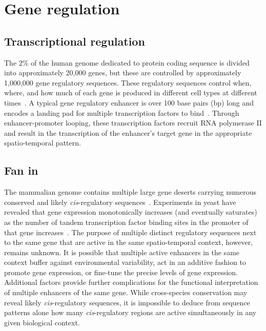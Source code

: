 \section{Gene regulation}

\subsection{Transcriptional regulation}

The 2\% of the human genome dedicated to protein coding sequence is divided into approximately 20,000 genes, but these are controlled by approximately 1,000,000 gene regulatory sequences. These regulatory sequences control when, where, and how much of each gene is produced in different cell types at different times~\citep{Levo:2014hl}. A typical gene regulatory enhancer is over 100 base pairs (bp) long and encodes a landing pad for multiple transcription factors to bind~\citep{Spitz:2012fj}. Through enhancer-promoter looping, these transcription factors recruit RNA polymerase II and result in the transcription of the enhancer's target gene in the appropriate spatio-temporal pattern.

\subsection{Fan in}

The mammalian genome contains multiple large gene deserts carrying numerous conserved and likely \emph{cis}-regulatory sequences~\citep{Ovcharenko:2005br}. Experiments in yeast have revealed that gene expression monotonically increases (and eventually saturates) as the number of tandem transcription factor binding sites in the promoter of that gene increases~\citep{Sharon:2012io}. The purpose of multiple distinct regulatory sequences next to the same gene that are active in the same spatio-temporal context, however, remains unknown. It is possible that multiple active enhancers in the same context buffer against environmental variability, act in an additive fashion to promote gene expression, or fine-tune the precise levels of gene expression. Additional factors provide further complications for the functional interpretation of multiple enhancers of the same gene. While cross-species conservation may reveal likely \emph{cis}-regulatory sequences, it is impossible to deduce from sequence patterns alone how many \emph{cis}-regulatory regions are active simultaneously in any given biological context.

